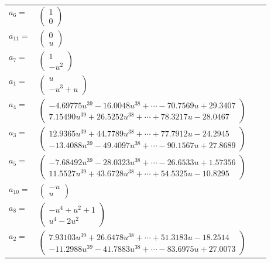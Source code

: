 \documentclass[1p]{elsarticle_modified}
\theoremstyle{definition}
\begin{document}
\begin{tabular}{m{7pt} m{180pt} m{7pt} m{180pt} }
\flushright $a_{6}=$&$\begin{pmatrix}1\\0\end{pmatrix}$ \\
\flushright $a_{11}=$&$\begin{pmatrix}0\\u\end{pmatrix}$ \\
\flushright $a_{7}=$&$\begin{pmatrix}1\\- u^2\end{pmatrix}$ \\
\flushright $a_{1}=$&$\begin{pmatrix}u\\- u^3+u\end{pmatrix}$ \\
\flushright $a_{4}=$&$\begin{pmatrix}-4.69775 u^{39}-16.0048 u^{38}+\cdots-70.7569 u+29.3407\\7.15490 u^{39}+26.5252 u^{38}+\cdots+78.3217 u-28.0467\end{pmatrix}$ \\
\flushright $a_{3}=$&$\begin{pmatrix}12.9365 u^{39}+44.7789 u^{38}+\cdots+77.7912 u-24.2945\\-13.4088 u^{39}-49.4097 u^{38}+\cdots-90.1567 u+27.8689\end{pmatrix}$ \\
\flushright $a_{5}=$&$\begin{pmatrix}-7.68492 u^{39}-28.0323 u^{38}+\cdots-26.6533 u+1.57356\\11.5527 u^{39}+43.6728 u^{38}+\cdots+54.5325 u-10.8295\end{pmatrix}$ \\
\flushright $a_{10}=$&$\begin{pmatrix}- u\\u\end{pmatrix}$ \\
\flushright $a_{8}=$&$\begin{pmatrix}- u^4+u^2+1\\u^4-2 u^2\end{pmatrix}$ \\
\flushright $a_{2}=$&$\begin{pmatrix}7.93103 u^{39}+26.6478 u^{38}+\cdots+51.3183 u-18.2514\\-11.2988 u^{39}-41.7883 u^{38}+\cdots-83.6975 u+27.0073\end{pmatrix}$ \\

\end{tabular}
\end{document}
